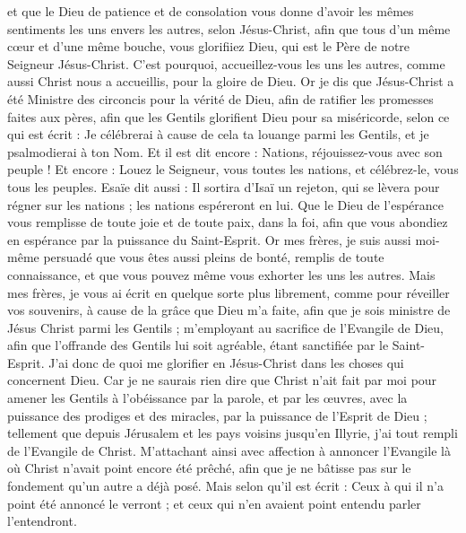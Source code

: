 \begin{multicols}{2}
et que le Dieu de patience et de consolation vous donne d'avoir les mêmes sentiments les uns envers les autres, selon Jésus-Christ,
afin que tous d'un même cœur et d'une même bouche, vous glorifiiez Dieu, qui est le Père de notre Seigneur Jésus-Christ.
C'est pourquoi, accueillez-vous les uns les autres, comme aussi Christ nous a accueillis, pour la gloire de Dieu.
Or je dis que Jésus-Christ a été Ministre des circoncis pour la vérité de Dieu, afin de ratifier les promesses faites aux pères,
afin que les Gentils glorifient Dieu pour sa miséricorde, selon ce qui est écrit : Je célébrerai à cause de cela ta louange parmi les Gentils, et je psalmodierai à ton Nom. Et il est dit encore :
Nations, réjouissez-vous avec son peuple !
Et encore : Louez le Seigneur, vous toutes les nations, et célébrez-le, vous tous les peuples. Esaïe dit aussi :
Il sortira d'Isaï un rejeton, qui se lèvera pour régner sur les nations ; les nations espéreront en lui.
Que le Dieu de l'espérance vous remplisse de toute joie et de toute paix, dans la foi, afin que vous abondiez en espérance par la puissance du Saint-Esprit.
 Or mes frères, je suis aussi moi-même persuadé que vous êtes aussi pleins de bonté, remplis de toute connaissance, et que vous pouvez même vous exhorter les uns les autres.
Mais mes frères, je vous ai écrit en quelque sorte plus librement, comme pour réveiller vos souvenirs, à cause de la grâce que Dieu m'a faite,
afin que je sois ministre de Jésus Christ parmi les Gentils ; m'employant au sacrifice de l'Evangile de Dieu, afin que l'offrande des Gentils lui soit agréable, étant sanctifiée par le Saint-Esprit.
J'ai donc de quoi me glorifier en Jésus-Christ dans les choses qui concernent Dieu.
Car je ne saurais rien dire que Christ n'ait fait par moi pour amener les Gentils à l'obéissance par la parole, et par les œuvres,
avec la puissance des prodiges et des miracles, par la puissance de l'Esprit de Dieu ; tellement que depuis Jérusalem et les pays voisins jusqu'en Illyrie, j'ai tout rempli de l'Evangile de Christ.
M'attachant ainsi avec affection à annoncer l'Evangile là où Christ n'avait point encore été prêché, afin que je ne bâtisse pas sur le fondement qu'un autre a déjà posé. 
Mais selon qu'il est écrit : Ceux à qui il n'a point été annoncé le verront ; et ceux qui n'en avaient point entendu parler l'entendront.

\end{multicols}
